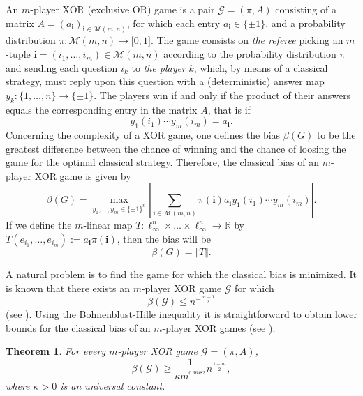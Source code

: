 \documentclass[10pt]{amsart}
\newtheorem{theorem}{Theorem}[section]
\numberwithin{equation}{section}
\begin{document}
An $m$-player XOR (exclusive OR) game is a pair $\mathcal{G}=\left(
\pi,A\right) $ consisting of a matrix $A=\left( a_{\mathbf{i}}\right) _{\mathbf{i}\in \mathcal{M}(m,n)}$, for which each entry $a_{\mathbf{i}}\in
\{\pm 1\}$, and a probability distribution $\pi :\mathcal{M}(m,n)\rightarrow
\lbrack 0,1]$. The game consists on \emph{the referee} picking an $m$-tuple $\mathbf{i}=(i_{1},\dots ,i_{m})\in \mathcal{M}(m,n)$ according to the
probability distribution $\pi $ and sending each question $i_{k}$ to \emph{the player} $k$, which, by means of a classical strategy, must reply upon
this question with a (deterministic) answer map $y_{k}:\{1,\dots
,n\}\rightarrow \{\pm 1\}$. The players win if and only if the product of
their answers equals the corresponding entry in the matrix $A$, that is if
\begin{equation*}
y_{1}(i_{1})\cdots y_{m}(i_{m})=a_{\mathbf{i}}.
\end{equation*}Concerning the complexity of a XOR game, one defines the bias $\beta (G)$ to
be the greatest difference between the chance of winning and the chance of
loosing the game for the optimal classical strategy. Therefore, the
classical bias of an $m$-player XOR game is given by
\begin{equation*}
\beta (G)=\max_{y_{1},\dots ,y_{m}\in \{\pm 1\}^{n}} \left\vert \sum_{\mathbf{i}\in \mathcal{M}(m,n)}\pi (\mathbf{i})a_{\mathbf{i}}y_{1}(i_{1})\cdots y_{m}(i_{m})\right\vert .
\end{equation*}
If we define the $m$-linear map $T:\ell _{\infty }^{n}\times \dots \times
\ell _{\infty }^{n}\rightarrow \mathbb{R}$ by $T(e_{i_{1}},\dots
,e_{i_{m}}):=a_{\mathbf{i}}\pi (\mathbf{i})$, then the bias will be
\begin{equation*}
\beta (G)=\Vert T\Vert .
\end{equation*}

A natural problem is to find the game for which the classical bias is
minimized. It is known that there exists an $m$-player XOR game $\mathcal{G}$
for which
\begin{equation*}
\beta(\mathcal{G}) \leq n^{-\frac{m-1}{2}}
\end{equation*}
(see \cite{FordGal}). Using the Bohnenblust-Hille inequality it is
straightforward to obtain lower bounds for the classical bias of an $m$-player XOR games (see \cite[Theorem 5]{Montanaro}).

\begin{theorem}
{\cite[Theorem 5]{Montanaro}} For every $m$-player XOR game $\mathcal{G} =
(\pi,A)$,
\begin{equation*}
\beta(\mathcal{G}) \geq \frac{1}{\kappa m^{^{0.36482}}}n^{\frac{1-m}{2}},
\end{equation*}
where $\kappa>0$ is an universal constant.
\end{theorem}
\end{document}
